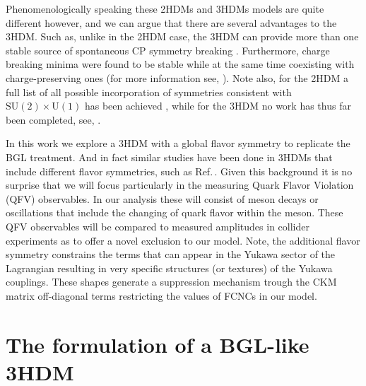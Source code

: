 \documentclass[10pt]{book}
\renewcommand{\(}{\left(}
\renewcommand{\)}{\right)}
\renewcommand{\[}{\left[}
\renewcommand{\]}{\right]}
\begin{document}
Phenomenologically speaking these 2HDMs and 3HDMs models are quite different however, and we can argue that there are several advantages to the 3HDM. Such as, unlike in the 2HDM case, the 3HDM can provide more than one stable source of spontaneous CP symmetry breaking \cite{Branco_2012}. Furthermore, charge breaking minima were found to be stable while at the same time coexisting with charge-preserving ones (for more information see, \cite{Barroso_2006}). Note also, for the 2HDM a full list of all possible incorporation of symmetries consistent with $\mathrm{SU(2)}\times\mathrm{U(1)}$ has been achieved \cite{Ivanov_2008}, while for the 3HDM no work has thus far been completed, see, \cite{Ivanov_2015}. 

In this work we explore a 3HDM with a global flavor symmetry to replicate the BGL treatment. And in fact similar studies have been done in 3HDMs that include different flavor symmetries, such as Ref.\,\cite{Camargo_Molina_2018}. Given this background it is no surprise that we will focus particularly in the measuring Quark Flavor Violation (QFV) observables. In our analysis these will consist of meson decays or oscillations that include the changing of quark flavor within the meson. These QFV observables will be compared to measured amplitudes in collider experiments as to offer a novel exclusion to our model. Note, the additional flavor symmetry constrains the terms that can appear in the Yukawa sector of the Lagrangian resulting in very specific structures (or textures) of the Yukawa couplings. These shapes generate a suppression mechanism trough the CKM matrix off-diagonal terms restricting the values of FCNCs in our model.%

 
\section{The formulation of a BGL-like 3HDM} 
\end{document}
